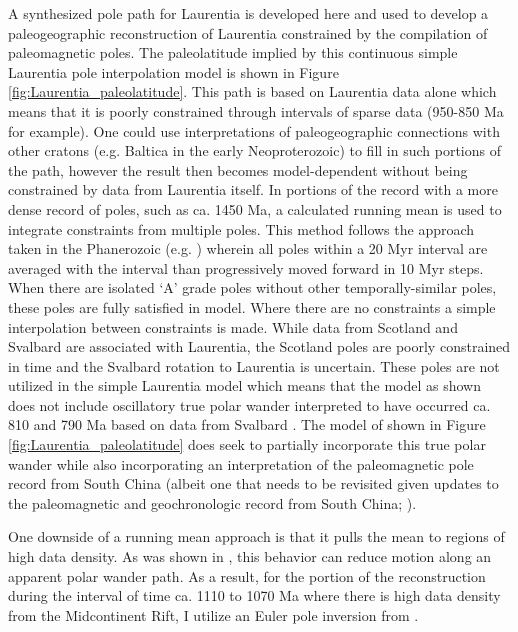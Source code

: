 \documentclass[twocolumn, switch]{article} %
\begin{document}
A synthesized pole path for Laurentia is developed here and used to develop a paleogeographic reconstruction of Laurentia constrained by the compilation of paleomagnetic poles. The paleolatitude implied by this continuous simple Laurentia pole interpolation model is shown in Figure \ref{fig:Laurentia_paleolatitude}. This path is based on Laurentia data alone which means that it is poorly constrained through intervals of sparse data (950-850 Ma for example). One could use interpretations of paleogeographic connections with other cratons (e.g. Baltica in the early Neoproterozoic) to fill in such portions of the path, however the result then becomes model-dependent without being constrained by data from Laurentia itself. In portions of the record with a more dense record of poles, such as ca. 1450 Ma, a calculated running mean is used to integrate constraints from multiple poles. This method follows the approach taken in the Phanerozoic (e.g. \citealp{Torsvik2012a}) wherein all poles within a 20 Myr interval are averaged with the interval than progressively moved forward in 10 Myr steps. When there are isolated `A' grade poles without other temporally-similar poles, these poles are fully satisfied in model. Where there are no constraints a simple interpolation between constraints is made. While data from Scotland and Svalbard are associated with Laurentia, the Scotland poles are poorly constrained in time and the Svalbard rotation to Laurentia is uncertain. These poles are not utilized in the simple Laurentia model which means that the model as shown does not include oscillatory true polar wander interpreted to have occurred ca. 810 and 790 Ma based on data from Svalbard \citep{Maloof2006a}. The model of \cite{Li2013a} shown in Figure \ref{fig:Laurentia_paleolatitude} does seek to partially incorporate this true polar wander while also incorporating an interpretation of the paleomagnetic pole record from South China (albeit one that needs to be revisited given updates to the paleomagnetic and geochronologic record from South China; \citealp{Zhang2021a}).

One downside of a running mean approach is that it pulls the mean to regions of high data density. As was shown in \cite{Swanson-Hysell2019a}, this behavior can reduce motion along an apparent polar wander path. As a result, for the portion of the reconstruction during the interval of time ca. 1110 to 1070 Ma where there is high data density from the Midcontinent Rift, I utilize an Euler pole inversion from \cite{Swanson-Hysell2019a}.
\end{document}
